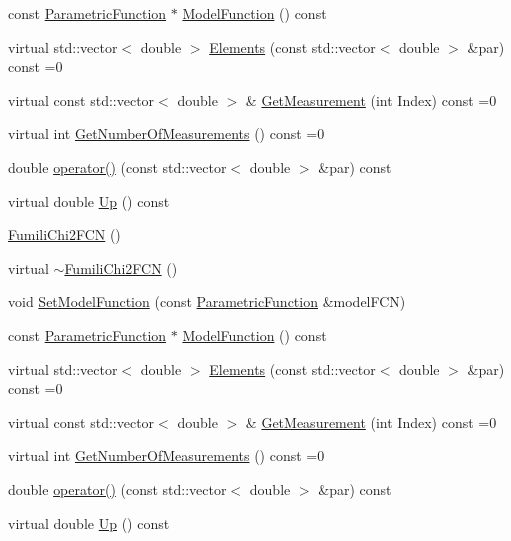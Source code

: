 \begin{DoxyCompactItemize}
\item 
const \mbox{\hyperlink{classROOT_1_1Minuit2_1_1ParametricFunction}{Parametric\+Function}} $\ast$ \mbox{\hyperlink{classROOT_1_1Minuit2_1_1FumiliChi2FCN_a3d31739e476a413e0c5616bb0c6283b9}{Model\+Function}} () const
\item 
virtual std\+::vector$<$ double $>$ \mbox{\hyperlink{classROOT_1_1Minuit2_1_1FumiliChi2FCN_a25cc8dcc2eff831b3c0a94bf5413c2cd}{Elements}} (const std\+::vector$<$ double $>$ \&par) const =0
\item 
virtual const std\+::vector$<$ double $>$ \& \mbox{\hyperlink{classROOT_1_1Minuit2_1_1FumiliChi2FCN_a1831875c53596cd4aa52ea536de53b60}{Get\+Measurement}} (int Index) const =0
\item 
virtual int \mbox{\hyperlink{classROOT_1_1Minuit2_1_1FumiliChi2FCN_afa1acb8484d1c1825de0dd641e301717}{Get\+Number\+Of\+Measurements}} () const =0
\item 
double \mbox{\hyperlink{classROOT_1_1Minuit2_1_1FumiliChi2FCN_ae7b2c2080162c0b946cf54090b712716}{operator()}} (const std\+::vector$<$ double $>$ \&par) const
\item 
virtual double \mbox{\hyperlink{classROOT_1_1Minuit2_1_1FumiliChi2FCN_a7e68bc2b2eb631ec52b753d7d49c4414}{Up}} () const
\item 
\mbox{\hyperlink{classROOT_1_1Minuit2_1_1FumiliChi2FCN_ae0918088996b787c67bdbe0b79b134cb}{Fumili\+Chi2\+F\+CN}} ()
\item 
virtual \mbox{\hyperlink{classROOT_1_1Minuit2_1_1FumiliChi2FCN_a50ee230fc1f0a93c6b9491a031f19b94}{$\sim$\+Fumili\+Chi2\+F\+CN}} ()
\item 
void \mbox{\hyperlink{classROOT_1_1Minuit2_1_1FumiliChi2FCN_a0db1c6dd4cbdc96107490f572cce20da}{Set\+Model\+Function}} (const \mbox{\hyperlink{classROOT_1_1Minuit2_1_1ParametricFunction}{Parametric\+Function}} \&model\+F\+CN)
\item 
const \mbox{\hyperlink{classROOT_1_1Minuit2_1_1ParametricFunction}{Parametric\+Function}} $\ast$ \mbox{\hyperlink{classROOT_1_1Minuit2_1_1FumiliChi2FCN_a3d31739e476a413e0c5616bb0c6283b9}{Model\+Function}} () const
\item 
virtual std\+::vector$<$ double $>$ \mbox{\hyperlink{classROOT_1_1Minuit2_1_1FumiliChi2FCN_a25cc8dcc2eff831b3c0a94bf5413c2cd}{Elements}} (const std\+::vector$<$ double $>$ \&par) const =0
\item 
virtual const std\+::vector$<$ double $>$ \& \mbox{\hyperlink{classROOT_1_1Minuit2_1_1FumiliChi2FCN_a1831875c53596cd4aa52ea536de53b60}{Get\+Measurement}} (int Index) const =0
\item 
virtual int \mbox{\hyperlink{classROOT_1_1Minuit2_1_1FumiliChi2FCN_afa1acb8484d1c1825de0dd641e301717}{Get\+Number\+Of\+Measurements}} () const =0
\item 
double \mbox{\hyperlink{classROOT_1_1Minuit2_1_1FumiliChi2FCN_ae7b2c2080162c0b946cf54090b712716}{operator()}} (const std\+::vector$<$ double $>$ \&par) const
\item 
virtual double \mbox{\hyperlink{classROOT_1_1Minuit2_1_1FumiliChi2FCN_a7e68bc2b2eb631ec52b753d7d49c4414}{Up}} () const
\end{DoxyCompactItemize}
